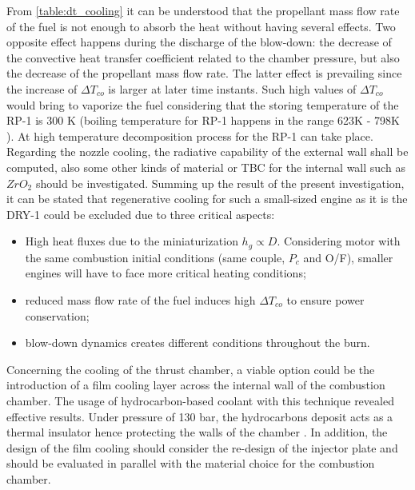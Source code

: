 From \autoref{table:dt_cooling} it can be understood that the propellant mass flow rate of the fuel is not enough to absorb the heat without having several effects. Two opposite effect happens during the discharge of the blow-down: the decrease of the convective heat transfer coefficient related to the chamber pressure, but also the decrease of the propellant mass flow rate. The latter effect is prevailing since the increase of $\Delta T_{co}$ is larger at later time instants. Such high values of $\Delta T_{co}$ would bring to vaporize the fuel considering that the storing temperature of the RP-1 is 300 K (boiling temperature for RP-1 happens in the range 623K - 798K \cite{rp_1_temp}). At high temperature decomposition process for the RP-1 can take place. Regarding the nozzle cooling, the radiative capability of the external wall shall be computed, also some other kinds of material or TBC for the internal wall such as $ZrO_2$  should be investigated. Summing up the result of the present investigation, it can be stated that regenerative cooling for such a small-sized engine as it is the DRY-1 could be excluded due to three critical aspects:
\begin{itemize}
    \item High heat fluxes due to the miniaturization $h_g \propto D$. Considering motor with the same combustion initial conditions (same couple, $P_c$ and O/F), smaller engines will have to face more critical heating conditions;
    \item reduced mass flow rate of the fuel induces high $\Delta T_{co}$ to ensure power conservation;
    \item blow-down dynamics creates different conditions throughout the burn.
\end{itemize}

Concerning the cooling of the thrust chamber, a viable option could be the introduction of a film cooling layer across the internal wall of the combustion chamber. The usage of hydrocarbon-based coolant with this technique revealed effective results. Under pressure of 130 bar, the hydrocarbons deposit acts as a thermal insulator hence protecting the walls of the chamber \cite{huzel_huang}. In addition, the design of the film cooling should consider the re-design of the injector plate and should be evaluated in parallel with the material choice for the combustion chamber.